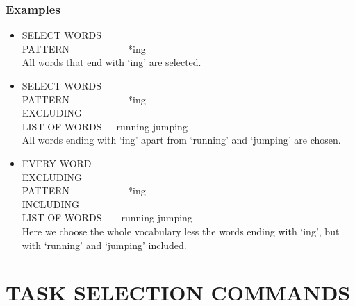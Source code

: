 \subsubsection{Examples}
\begin{itemize}
\item SELECT WORDS\\
\relax *PATTERN~~~~~~~~~~~~*ing\\
    All words that end with `ing' are selected.
\item SELECT WORDS\\
\relax *PATTERN~~~~~~~~~~~~*ing\\
EXCLUDING\\
\relax *LIST OF WORDS~~~running jumping\\
   All words ending with `ing' apart from `running' and `jumping' are chosen.
\item EVERY WORD\\
EXCLUDING\\
\relax *PATTERN~~~~~~~~~~~~*ing\\
INCLUDING\\
\relax *LIST OF WORDS~~~~running jumping\\
   Here we choose the whole vocabulary less the words ending with `ing',
   but with `running' and `jumping' included.
\end{itemize}

\section{TASK SELECTION COMMANDS}
